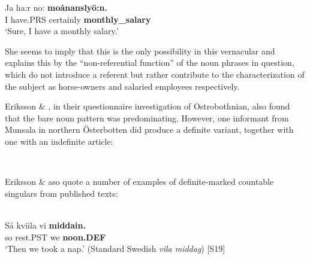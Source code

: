 \z

\ea
\gll Ja  ha:r  no:  \textbf{moånanslyö:n.}\\
I  have.PRS  certainly  \textbf{monthly\_salary}\\
\glt ‘Sure, I have a monthly salary.’

\z

She seems to imply that this is the only possibility in this vernacular and explains this by the “non-referential function” of the noun phrases in question, which do not introduce a referent but rather contribute to the characterization of the subject as horse-owners and salaried employees respectively. 


Eriksson \& \citet{Rendahl1999}, in their questionnaire investigation of Ostrobothnian, also found that the bare noun pattern was predominating. However, one informant from Munsala in northern Österbotten did produce a definite variant, together with one with an indefinite article:


\ea 
{}\\
	\z 
\z

Eriksson \& \citet{Rendahl1999} aso quote a number of examples of definite-marked countable singulars from published texts:


\ea \label{} 
\\
\gll Så  kviila  vi  \textbf{middain.} \\
so  rest.PST  we  \textbf{noon.DEF} \\
\glt ‘Then we took a nap.’ (Standard Swedish \textit{vila middag}) [S19]

